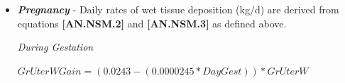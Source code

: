 \begin{refsection}
\begin{itemize}
            {\raggedleft \textbf{[AN.NSM.13]}\par}
            \vspace{0.2cm} 

\begin{center}
    \(ProtADG = (0.201 + 0.081 * (\frac{BW}{MW})) * \frac{EBG}{ADG}\) 
\end{center}
\vspace{0.5cm}

            {\raggedleft \textbf{[AN.NSM.14]}\par}
            \vspace{0.2cm} 
\begin{center}
    \(REFADG = 9.4 * FatADG + 5.55 * ProtADG\) 
\end{center}
\vspace{0.5cm}

            {\raggedleft \textbf{[AN.NSM.15]}\par}
            \vspace{0.2cm}

\begin{center}
    \(MEFrameADG = \frac{REFADG}{0.4}\) 
\end{center}
\vspace{0.5cm}

            {\raggedleft \textbf{[AN.NSM.16]}\par}
            \vspace{0.2cm}

\begin{center}
    \(NElFrameADG = \frac{REFADG}{0.61}\) 
\end{center}
\vspace{0.5cm}

            {\raggedleft \textbf{[AN.NSM.17]}\par}
            \vspace{0.2cm}
\vspace{0.5cm}



        \item \textbf{\textit{Pregnancy}} - Daily rates of wet tissue deposition (kg/d) are derived from equations \textbf{[AN.NSM.2]} and \textbf{[AN.NSM.3]} as defined above.
\vspace{0.2cm}

\textit{\small During Gestation}
\vspace{0.2cm}

\begin{center}
    \(GrUterWGain = (0.0243 - (0.0000245 * DayGest)) * GrUterW\)
\end{center}
\vspace{0.5cm}


\end{itemize}
\end{refsection}

